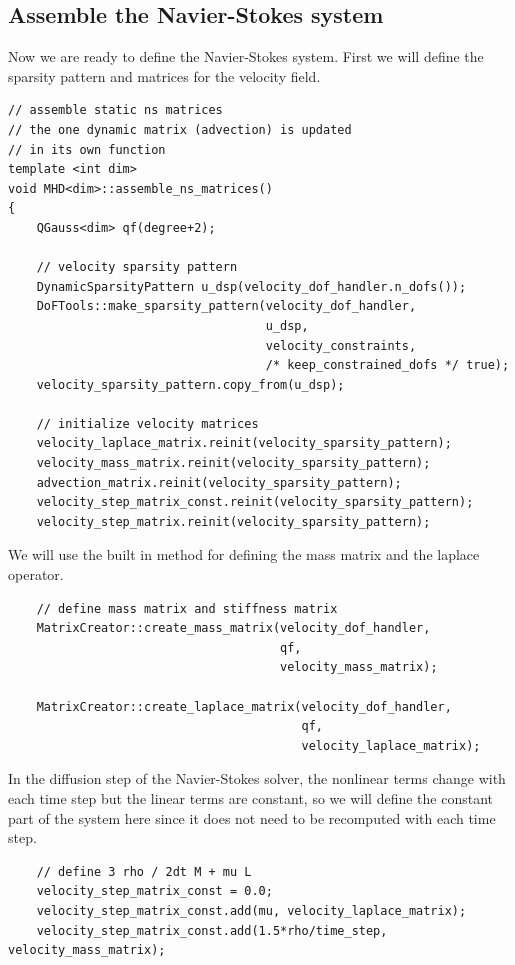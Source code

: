 \documentclass{article}
\begin{document}
\subsection*{Assemble the Navier-Stokes system}
Now we are ready to define the Navier-Stokes system. First we will define the sparsity pattern and matrices for the velocity field.
\begin{lstlisting}
// assemble static ns matrices
// the one dynamic matrix (advection) is updated
// in its own function
template <int dim>
void MHD<dim>::assemble_ns_matrices()
{
    QGauss<dim> qf(degree+2);

    // velocity sparsity pattern
    DynamicSparsityPattern u_dsp(velocity_dof_handler.n_dofs());
    DoFTools::make_sparsity_pattern(velocity_dof_handler,
                                    u_dsp,
                                    velocity_constraints,
                                    /* keep_constrained_dofs */ true);
    velocity_sparsity_pattern.copy_from(u_dsp);

    // initialize velocity matrices
    velocity_laplace_matrix.reinit(velocity_sparsity_pattern);
    velocity_mass_matrix.reinit(velocity_sparsity_pattern);
    advection_matrix.reinit(velocity_sparsity_pattern);
    velocity_step_matrix_const.reinit(velocity_sparsity_pattern);
    velocity_step_matrix.reinit(velocity_sparsity_pattern);
\end{lstlisting}
We will use the built in method for defining the mass matrix and the laplace operator.
\begin{lstlisting}
    // define mass matrix and stiffness matrix
    MatrixCreator::create_mass_matrix(velocity_dof_handler,
                                      qf,
                                      velocity_mass_matrix);

    MatrixCreator::create_laplace_matrix(velocity_dof_handler,
                                         qf,
                                         velocity_laplace_matrix);
                                         \end{lstlisting}
                                         In the diffusion step of the Navier-Stokes solver, the nonlinear terms change with each time step but the linear terms are constant, so we will define the constant part of the system here since it does not need to be recomputed with each time step.
                                         \begin{lstlisting}
    // define 3 rho / 2dt M + mu L
    velocity_step_matrix_const = 0.0;
    velocity_step_matrix_const.add(mu, velocity_laplace_matrix);
    velocity_step_matrix_const.add(1.5*rho/time_step, velocity_mass_matrix);
\end{lstlisting}
\end{document}
